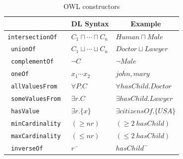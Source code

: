 \bigskip

\begin{table}[htp]
\centering
\begin{tabular}{ |>{\tt}l|l|l| }
    \hline
    \multicolumn{1}{|c|}{\textbf{Constructor}}  & \multicolumn{1}{c|}{\textbf{DL Syntax}}   & \multicolumn{1}{c|}{\textbf{Example}} \\ \hline
    intersectionOf                              & $C_{1}\sqcap\cdots\sqcap C_{n}$           & $Human \sqcap Male$ \\ \hline
    unionOf                                     & $C_{1}\sqcup\cdots\sqcup C_{n}$           & $\mathit{Doctor} \sqcup \mathit{Lawyer}$ \\ \hline
    complementOf                                & $\lnot C$                                 & $\lnot \mathit{Male}$ \\ \hline
    oneOf                                       & ${x_{1}\cdots x_{2}}$                     & ${\mathit{john},\mathit{mary}}$ \\ \hline
    allValuesFrom                               & $\forall P.C$                             & $\forall \mathit{hasChild}.\mathit{Doctor}$ \\ \hline
    someValuesFrom                              & $\exists r.C$                             & $\exists \mathit{hasChild}.\mathit{Lawyer}$ \\ \hline
    hasValue                                    & $\exists r.\{x\}$                         & $\exists \mathit{citizensOf}.\{\mathit{USA}\}$ \\ \hline
    minCardinality                              & $(\geq nr)$                               & $(\geq 2~\mathit{hasChild})$ \\ \hline
    maxCardinality                              & $(\leq nr)$                               & $(\leq 2~\mathit{hasChild})$ \\ \hline
    inverseOf                                   & $r^{-}$                                   & $\mathit{hasChild}^{-}$ \\ \hline
\end{tabular}
\caption{OWL constructors \cite{HLP08}}
\label{tab:owlConstructors}
\end{table}

